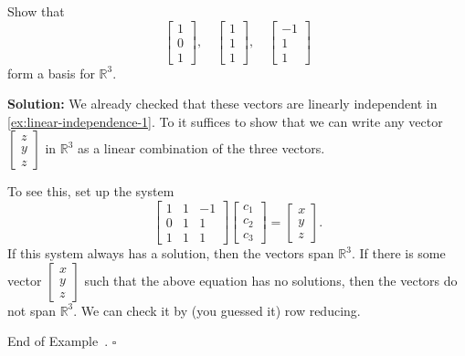 \documentclass[10pt]{article}
\theoremstyle{definition}
\newtheorem{example}[theorem]{Example}
\renewenvironment{example}
{\begin{oldexample}}
  {\par\smallskip\hfill   End of Example~\theexample. $\square$    \par\end{oldexample}}
\newcommand{\R}{\mathbb{R}}           %
\begin{document}
\begin{example}
  Show that
  \begin{equation*}
    \begin{bmatrix}
      1\\0\\1
    \end{bmatrix},\quad
    \begin{bmatrix}
      1\\1\\1
    \end{bmatrix},\quad
    \begin{bmatrix}
      -1\\1\\1
    \end{bmatrix}
  \end{equation*}
  form a basis for $\R^{3}$.

  \textbf{Solution:} We already checked that these vectors are linearly
  independent in \cref{ex:linear-independence-1}. To it suffices to show that
  we can write any vector $
  \begin{bmatrix}
    z\\y\\z
  \end{bmatrix}
  $ in $\R^{3}$ as a linear combination of the three vectors.

  To see this, set up the system
  \begin{equation*}
    \begin{bmatrix}
      1&1&-1\\
      0&1&1\\
      1&1&1      
    \end{bmatrix}
    \begin{bmatrix}
      c_{1}\\c_{2}\\c_{3}
    \end{bmatrix}
    =
    \begin{bmatrix}
      x\\y\\z
    \end{bmatrix}.
  \end{equation*}
  If this system always has a solution, then the vectors span $\R^{3}$. If
  there is some vector $ \begin{bmatrix} x\\y\\z \end{bmatrix} $ such that the
  above equation has no solutions, then the vectors do not span $\R^{3}$. We
  can check it by (you guessed it) row reducing.
  

\end{example}
\end{document}
